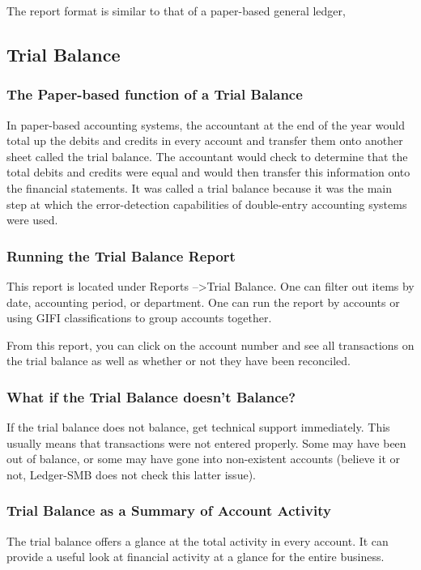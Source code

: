 \documentclass{article}
\begin{document}
The report format is similar to that of a paper-based general ledger,

\subsection{Trial Balance}
\subsubsection{The Paper-based function of a Trial Balance}
In paper-based accounting systems, the accountant at the end of the year would
total up the debits and credits in every account and transfer them onto another
sheet called the trial balance.  The accountant would check to determine that
the total debits and credits were equal and would then transfer this information
onto the financial statements.  It was called a trial balance because it was the
main step at which the error-detection capabilities of double-entry accounting
systems were used.

\subsubsection{Running the Trial Balance Report}
This report is located under Reports --\textgreater Trial Balance.  One can
filter out items by date, accounting period, or department.  One can run the
report by accounts or using GIFI classifications to group accounts together.

From this report, you can click on the account number and see all transactions
on the trial balance as well as whether or not they have been reconciled.

\subsubsection{What if the Trial Balance doesn't Balance?}
If the trial balance does not balance, get technical support immediately.  This
usually means that transactions were not entered properly.  Some may have been
out of balance, or some may have gone into non-existent accounts (believe it or
not, Ledger-SMB does not check this latter issue).

\subsubsection{Trial Balance as a Summary of Account Activity}
The trial balance offers a glance at the total activity in every account.  It
can provide a useful look at financial activity at a glance for the entire
business.
\end{document}
